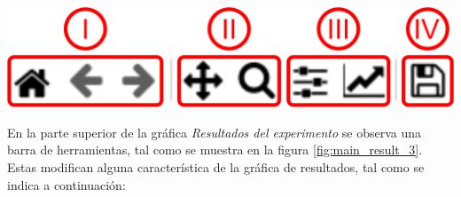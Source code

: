 \documentclass[12pt,twoside,letter]{ol-softwaremanual}
\newenvironment{Figure}
  {\par\medskip\noindent\minipage{\linewidth}}
  {\endminipage\par\medskip}
\begin{document}
\begin{multicols}{2}

\begin{Figure}
	\vspace{0.7cm}
	\centering
	\includegraphics[width=0.9\linewidth]{main-result-3.png}
	\label{fig:main_result_3}
\end{Figure}

En la parte superior de la gráfica \textit{Resultados del experimento} se observa una barra de herramientas, tal como se muestra en la figura \ref{fig:main_result_3}. Estas modifican alguna característica de la gráfica de resultados, tal como se indica a continuación:

\end{multicols}

\vspace{0.2cm}
\end{document}
